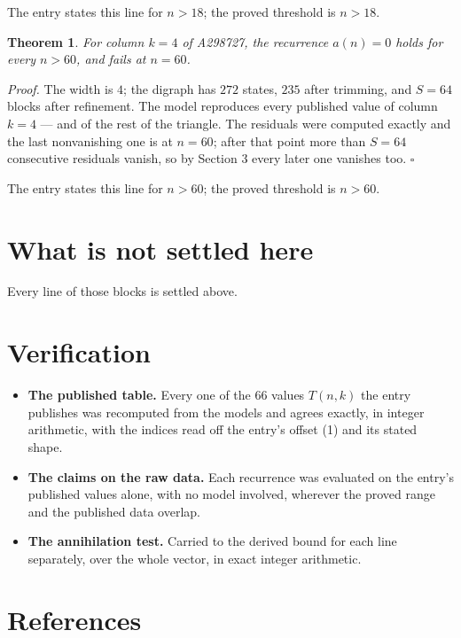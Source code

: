 \documentclass[11pt]{article}
\newtheorem{theorem}{Theorem}
\theoremstyle{definition}
\begin{document}
The entry states this line for $n > 18$; the proved threshold is $n > 18$.

\begin{theorem} For column $k = 4$ of A298727, the recurrence $a(n) = 0$ holds for every $n > 60$, and fails at $n = 60$.\end{theorem}

{\itshape Proof.} The width is $4$; the digraph has $272$ states, $235$ after trimming, and $S = 64$ blocks after refinement. The model reproduces every published value of column $k = 4$ --- and of the rest of the triangle. The residuals were computed exactly and the last nonvanishing one is at $n = 60$; after that point more than $S = 64$ consecutive residuals vanish, so by Section 3 every later one vanishes too. $\square$

The entry states this line for $n > 60$; the proved threshold is $n > 60$.

\section{What is not settled here}

Every line of those blocks is settled above.

\section{Verification}

\begin{itemize}

\item {\bfseries The published table.} Every one of the 66 values $T(n,k)$ the entry publishes was recomputed from the models and agrees exactly, in integer arithmetic, with the indices read off the entry's offset (1) and its stated shape.

\item {\bfseries The claims on the raw data.} Each recurrence was evaluated on the entry's published values alone, with no model involved, wherever the proved range and the published data overlap.

\item {\bfseries The annihilation test.} Carried to the derived bound for each line separately, over the whole vector, in exact integer arithmetic.

\end{itemize}

\section{References}
\end{document}
